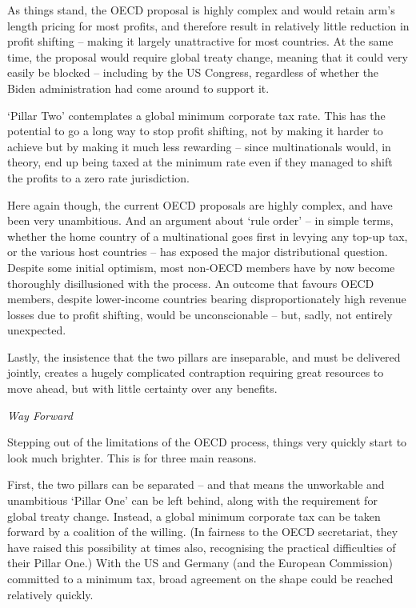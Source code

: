 \documentclass[
]{book}
\begin{document}
As things stand, the OECD proposal is highly complex and would retain arm's length pricing for most profits, and therefore result in relatively little reduction in profit shifting -- making it largely unattractive for most countries. At the same time, the proposal would require global treaty change, meaning that it could very easily be blocked -- including by the US Congress, regardless of whether the Biden administration had come around to support it.

`Pillar Two' contemplates a global minimum corporate tax rate. This has the potential to go a long way to stop profit shifting, not by making it harder to achieve but by making it much less rewarding -- since multinationals would, in theory, end up being taxed at the minimum rate even if they managed to shift the profits to a zero rate jurisdiction.

Here again though, the current OECD proposals are highly complex, and have been very unambitious. And an argument about `rule order' -- in simple terms, whether the home country of a multinational goes first in levying any top-up tax, or the various host countries -- has exposed the major distributional question. Despite some initial optimism, most non-OECD members have by now become thoroughly disillusioned with the process. An outcome that favours OECD members, despite lower-income countries bearing disproportionately high revenue losses due to profit shifting, would be unconscionable -- but, sadly, not entirely unexpected.

Lastly, the insistence that the two pillars are inseparable, and must be delivered jointly, creates a hugely complicated contraption requiring great resources to move ahead, but with little certainty over any benefits.

\emph{Way Forward}

Stepping out of the limitations of the OECD process, things very quickly start to look much brighter. This is for three main reasons.

First, the two pillars can be separated -- and that means the unworkable and unambitious `Pillar One' can be left behind, along with the requirement for global treaty change. Instead, a global minimum corporate tax can be taken forward by a coalition of the willing. (In fairness to the OECD secretariat, they have raised this possibility at times also, recognising the practical difficulties of their Pillar One.) With the US and Germany (and the European Commission) committed to a minimum tax, broad agreement on the shape could be reached relatively quickly.
\end{document}
